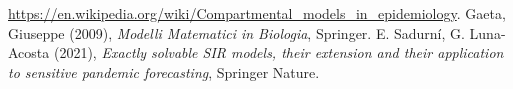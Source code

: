 \cleardoublepage
{}
{}
\begin{thebibliography}{9}
 \url{https://en.wikipedia.org/wiki/Compartmental_models_in_epidemiology}.
 Gaeta, Giuseppe (2009), \emph{Modelli Matematici in Biologia}, Springer.
 E. Sadurní, G. Luna-Acosta (2021), \emph{Exactly solvable SIR models, their extension and their application to sensitive pandemic forecasting}, Springer Nature.
\end{thebibliography}